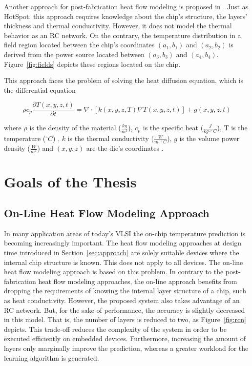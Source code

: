 \documentclass[12pt,twoside,doublepage]{article}
\begin{document}
Another approach for post-fabrication heat flow modeling is proposed in \cite{Sapatnekar2005}.
Just as HotSpot, this approach requires knowledge about the chip's structure, the layers' thickness and thermal conductivity. However, it does not model the thermal behavior as an RC network. On the contrary, the temperature distribution in a field region located between the chip's coordinates $(a_1,b_1)$ and $(a_2,b_2)$ is derived from the power source located between $(a_3,b_3)$ and $(a_4,b_4)$. Figure~\ref{fig:fields} depicts these regions located on the chip.
 
This approach faces the problem of solving the heat diffusion equation, which is the differential equation
 
\begin{equation}
\label{eq:hde}
\rho c_p \frac{\partial T(x,y,z,t)}{\partial t} =
\nabla \cdot [k(x,y,z,T) \nabla T(x,y,z,t)] +g(x,y,z,t)
\end{equation}
 
where $\rho$ is the density of the material ($\frac{kg}{m^3}$), $c_p$ is the specific heat ($\frac{J}{kg\cdot ^\circ C}$), T is the temperature ($^\circ C$) , $k$ is the thermal conductivity ($\frac{W}{m \cdot ^\circ C}$), $g$ is the volume power density ($\frac{W}{m^3}$) and $(x,y,z)$ are the die's coordinates \cite{Sapatnekar2005}.
 
\section{Goals of the Thesis}
\label{sec:goals}
 
\subsection{On-Line Heat Flow Modeling Approach}
\label{sec:online}
 
In many application areas of today's VLSI the on-chip temperature prediction is becoming increasingly important. The heat flow modeling approaches at design time introduced in Section~\ref{sec:approach} are solely suitable devices where the internal chip structure is known. This does not apply to all devices. The on-line heat flow modeling approach is based on this problem.
In contrary to the post-fabrication heat flow modeling approaches, the on-line approach benefits from dropping the requirements of knowing the internal layer structure of a chip, such as heat conductivity. However, the proposed system \cite{Happe} also takes advantage of an RC network. But, for the sake of performance, the accuracy is slightly decreased in this model. That is, the number of layers is reduced to two, as Figure~\ref{fig:rcn} depicts. This trade-off reduces the complexity of the system in order to be executed efficiently on embedded devices. Furthermore, increasing the amount of layers only marginally improve the prediction, whereas a greater workload for the learning algorithm is generated.
 
\end{document}
